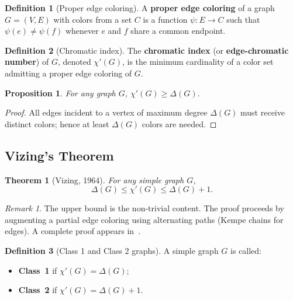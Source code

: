 \documentclass[12pt,a4paper]{article}
\theoremstyle{definition}
\newtheorem{definition}{Definition}[section]
\theoremstyle{plain}
\newtheorem{theorem}{Theorem}[section]
\newtheorem{proposition}{Proposition}[section]
\theoremstyle{remark}
\newtheorem{remark}{Remark}[section]
\begin{document}
\begin{definition}[Proper edge coloring]\label{def:edge-coloring}
  A \textbf{proper edge coloring} of a graph $G=(V,E)$ with colors from a set
  $C$ is a function $\psi\colon E \to C$ such that $\psi(e) \neq \psi(f)$
  whenever $e$ and $f$ share a common endpoint.
\end{definition}

\begin{definition}[Chromatic index]\label{def:chromatic-index}
  The \textbf{chromatic index} (or \textbf{edge-chromatic number}) of $G$,
  denoted $\chi'(G)$, is the minimum cardinality of a color set admitting a
  proper edge coloring of $G$.
\end{definition}

\begin{proposition}\label{prop:edge-lower}
  For any graph $G$, $\chi'(G) \geq \Delta(G)$.
\end{proposition}

\begin{proof}
  All edges incident to a vertex of maximum degree $\Delta(G)$ must receive
  distinct colors; hence at least $\Delta(G)$ colors are needed.
\end{proof}

\subsection{Vizing's Theorem}

\begin{theorem}[Vizing, 1964]\label{thm:vizing}
  For any simple graph $G$,
  \[
    \Delta(G) \leq \chi'(G) \leq \Delta(G) + 1.
  \]
\end{theorem}

\begin{remark}\label{rem:vizing-proof}
  The upper bound is the non-trivial content.  The proof proceeds by augmenting
  a partial edge coloring using alternating paths (Kempe chains for edges).
  A complete proof appears in~\cite{diestel2017}.
\end{remark}

\begin{definition}[Class 1 and Class 2 graphs]\label{def:class12}
  A simple graph $G$ is called:
  \begin{itemize}
    \item \textbf{Class~1} if $\chi'(G) = \Delta(G)$;
    \item \textbf{Class~2} if $\chi'(G) = \Delta(G) + 1$.
  \end{itemize}
\end{definition}
\end{document}

